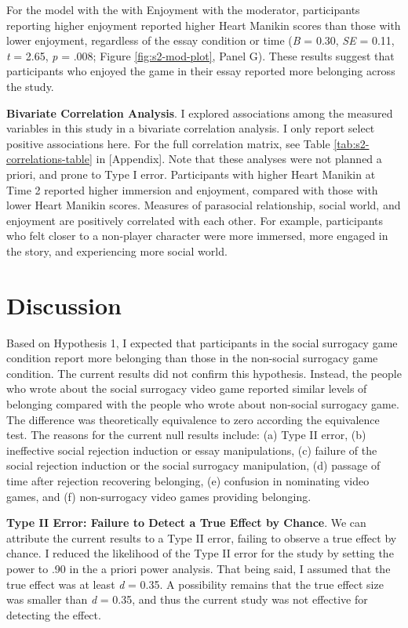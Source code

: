 \documentclass[
]{udthesis}
\begin{document}
For the model with the with Enjoyment with the moderator, participants reporting higher enjoyment reported higher Heart Manikin scores than those with lower enjoyment, regardless of the essay condition or time (\emph{B} = 0.30, \emph{SE} = 0.11, \emph{t} = 2.65, \emph{p} = .008; Figure \ref{fig:s2-mod-plot}, Panel G). These results suggest that participants who enjoyed the game in their essay reported more belonging across the study.

\textbf{Bivariate Correlation Analysis}. I explored associations among the measured variables in this study in a bivariate correlation analysis. I only report select positive associations here. For the full correlation matrix, see Table \ref{tab:s2-correlations-table} in {[}Appendix{]}. Note that these analyses were not planned a priori, and prone to Type I error. Participants with higher Heart Manikin at Time 2 reported higher immersion and enjoyment, compared with those with lower Heart Manikin scores. Measures of parasocial relationship, social world, and enjoyment are positively correlated with each other. For example, participants who felt closer to a non-player character were more immersed, more engaged in the story, and experiencing more social world.

\section{Discussion}\label{discussion-1}

Based on Hypothesis 1, I expected that participants in the social surrogacy game condition report more belonging than those in the non-social surrogacy game condition. The current results did not confirm this hypothesis. Instead, the people who wrote about the social surrogacy video game reported similar levels of belonging compared with the people who wrote about non-social surrogacy game. The difference was theoretically equivalence to zero according the equivalence test. The reasons for the current null results include: (a) Type II error, (b) ineffective social rejection induction or essay manipulations, (c) failure of the social rejection induction or the social surrogacy manipulation, (d) passage of time after rejection recovering belonging, (e) confusion in nominating video games, and (f) non-surrogacy video games providing belonging.

\textbf{Type II Error: Failure to Detect a True Effect by Chance}. We can attribute the current results to a Type II error, failing to observe a true effect by chance. I reduced the likelihood of the Type II error for the study by setting the power to .90 in the a priori power analysis. That being said, I assumed that the true effect was at least \emph{d} = 0.35. A possibility remains that the true effect size was smaller than \emph{d} = 0.35, and thus the current study was not effective for detecting the effect.
\end{document}
